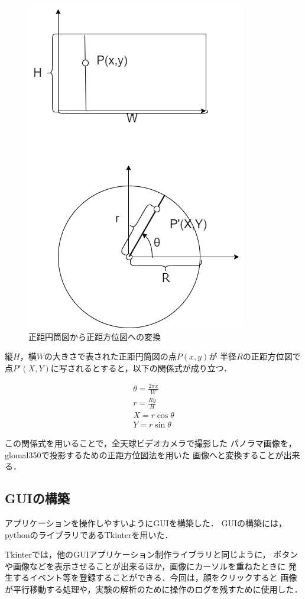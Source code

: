 \begin{figure}[tp]
  \centering
  \includegraphics[scale=1.0]{fig/convertintocircle.png}
  \caption{正距円筒図から正距方位図への変換}
\end{figure}

縦$H$，横$W$の大きさで表された正距円筒図の点$P(x,y)$が
半径$R$の正距方位図で点$P'(X,Y)$に写されるとすると，以下の関係式が成り立つ．


\begin{eqnarray}
  \theta = \frac{2\pi x}{W}  \nonumber \\
  r = \frac{Ry}{H} \nonumber \\
  X = r\cos{\theta} \nonumber \\
  Y = r\sin{\theta} \nonumber
\end{eqnarray}

この関係式を用いることで，全天球ビデオカメラで撮影した
パノラマ画像を，glomal350で投影するための正距方位図法を用いた
画像へと変換することが出来る．

\subsection*{GUIの構築}
アプリケーションを操作しやすいようにGUIを構築した．
GUIの構築には，pythonのライブラリであるTkinterを用いた．

Tkinterでは，他のGUIアプリケーション制作ライブラリと同じように，
ボタンや画像などを表示させることが出来るほか，画像にカーソルを重ねたときに
発生するイベント等を登録することができる．今回は，顔をクリックすると
画像が平行移動する処理や，実験の解析のために操作のログを残すために使用した．